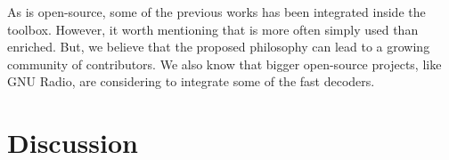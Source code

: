 As \AFFECT is open-source, some of the previous works has been integrated inside
the toolbox. However, it worth mentioning that \AFFECT is more often simply used
than enriched. But, we believe that the proposed philosophy can lead to a
growing community of contributors. We also know that bigger open-source
projects, like GNU Radio, are considering to integrate some of the \AFFECT fast
decoders.

\section{Discussion}
